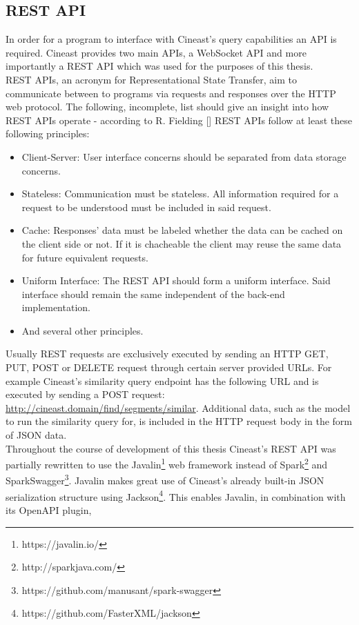 \subsection{REST API}

In order for a program to interface with Cineast's query capabilities an API is required. Cineast provides two main APIs, a WebSocket API and more importantly a REST API which was
used for the purposes of this thesis.\\
REST APIs, an acronym for Representational State Transfer, aim to communicate between to programs via requests and responses over the HTTP web protocol. The following, incomplete, list should give an insight
into how REST APIs operate - according to R. Fielding [] REST APIs follow at least these following principles:
\begin{itemize}
	\item Client-Server: User interface concerns should be separated from data storage concerns.
	\item Stateless: Communication must be stateless. All information required for a request to be understood must be included in said request.
	\item Cache: Responses' data must be labeled whether the data can be cached on the client side or not. If it is chacheable the client may reuse the same data for future equivalent requests.
	\item Uniform Interface: The REST API should form a uniform interface. Said interface should remain the same independent of the back-end implementation.
	\item And several other principles.
\end{itemize}
Usually REST requests are exclusively executed by sending an HTTP GET, PUT, POST or DELETE request through certain server provided URLs. For example Cineast's similarity query endpoint has the following URL and is executed by
sending a POST request: \url{http://cineast.domain/find/segments/similar}. Additional data, such as the model to run the similarity query for, is included in the HTTP request body in the form of JSON data.\\
Throughout the course of development of this thesis Cineast's REST API was partially rewritten to use the Javalin\footnote{https://javalin.io/} web framework instead of Spark\footnote{http://sparkjava.com/} and SparkSwagger\footnote{https://github.com/manusant/spark-swagger}. Javalin makes great use of Cineast's already built-in JSON serialization structure using Jackson\footnote{https://github.com/FasterXML/jackson}. This enables Javalin, in combination with its OpenAPI plugin,
